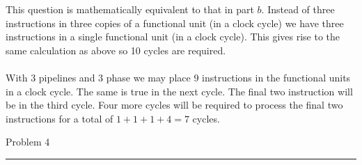 \documentclass[11pt,reqno]{article}
\begin{document}
This question is mathematically equivalent to that in part $b$. Instead of three instructions in three copies of a functional unit (in a clock cycle) we have three instructions in a single functional unit (in a clock cycle). This gives rise to the same calculation as above so 10 cycles are required.\\

\noindent{}\\ 

With 3 pipelines and 3 phase we may place 9 instructions in the functional units in a clock cycle. The same is true in the next cycle. The final two instruction will be in the third cycle. Four more cycles will be required to process the final two instructions for a total of $1+1+1+ 4 = 7$ cycles.
\newpage

\begin{flushleft} 
Problem 4 \\
\rule{500pt}{1pt}\\
\end{flushleft} 
\end{document}
